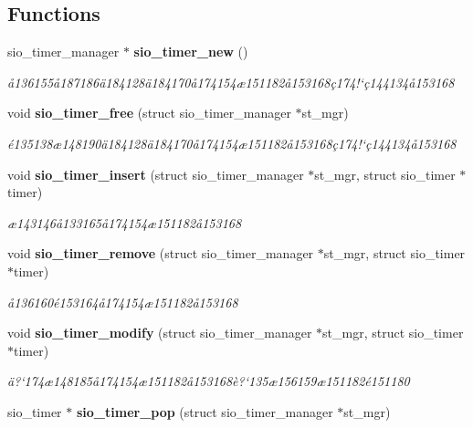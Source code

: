 \subsection*{Functions}
\begin{CompactItemize}
\item 
sio\_\-timer\_\-manager $\ast$ {\bf sio\_\-timer\_\-new} ()
\begin{CompactList}\small\item\em \aa{}136155\aa{}187186\"{a}184128\"{a}184170\aa{}174154\ae{}151182\aa{}153168\c{c}174!`\c{c}144134\aa{}153168 \item\end{CompactList}\item 
void {\bf sio\_\-timer\_\-free} (struct sio\_\-timer\_\-manager $\ast$st\_\-mgr)
\begin{CompactList}\small\item\em \'{e}135138\ae{}148190\"{a}184128\"{a}184170\aa{}174154\ae{}151182\aa{}153168\c{c}174!`\c{c}144134\aa{}153168 \item\end{CompactList}\item 
void {\bf sio\_\-timer\_\-insert} (struct sio\_\-timer\_\-manager $\ast$st\_\-mgr, struct sio\_\-timer $\ast$timer)
\begin{CompactList}\small\item\em \ae{}143146\aa{}133165\aa{}174154\ae{}151182\aa{}153168 \item\end{CompactList}\item 
void {\bf sio\_\-timer\_\-remove} (struct sio\_\-timer\_\-manager $\ast$st\_\-mgr, struct sio\_\-timer $\ast$timer)
\begin{CompactList}\small\item\em \aa{}136160\'{e}153164\aa{}174154\ae{}151182\aa{}153168 \item\end{CompactList}\item 
void {\bf sio\_\-timer\_\-modify} (struct sio\_\-timer\_\-manager $\ast$st\_\-mgr, struct sio\_\-timer $\ast$timer)
\begin{CompactList}\small\item\em \"{a}?`174\ae{}148185\aa{}174154\ae{}151182\aa{}153168\`{e}?`135\ae{}156159\ae{}151182\'{e}151180 \item\end{CompactList}\item 
sio\_\-timer $\ast$ {\bf sio\_\-timer\_\-pop} (struct sio\_\-timer\_\-manager $\ast$st\_\-mgr)

\end{CompactItemize}
